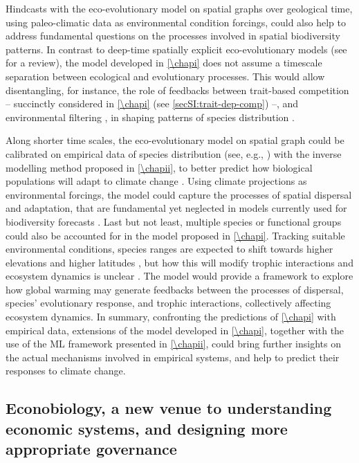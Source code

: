 Hindcasts with the eco-evolutionary model on spatial graphs over geological time, using paleo-climatic data \citep{STRAUME2020126} as environmental condition forcings, could also help to address fundamental questions on the processes involved in spatial biodiversity patterns. In contrast to deep-time spatially explicit eco-evolutionary models (see \cite{Hagen2022} for a review), the model developed in \cref{\chapi} does not assume a timescale separation between ecological and evolutionary processes.
% 
This would allow disentangling, for instance, the role of feedbacks between trait-based competition \citep{Dieckmann1999} -- succinctly considered in \cref{\chapi} (see \cref{secSI:trait-dep-comp}) --, and environmental filtering \citep{Doebeli2003}, in shaping patterns of species distribution \citep{Rahbek2019a}.

Along shorter time scales, the eco-evolutionary model on spatial graph could be calibrated on empirical data of species distribution (see, e.g., \cite{Abegg2020,GBIF:TheGlobalBiodiversityInformationFacility2022}) with the inverse modelling method proposed in \cref{\chapii}, to better predict how biological populations will adapt to climate change \citep{Norberg2012,Urban2016}. Using climate projections \citep{Kriticos2012} as environmental forcings, the model could capture the processes of spatial dispersal and adaptation, that are fundamental yet neglected in models currently used for biodiversity forecasts \citep{Pearson2003}.
% 
Last but not least, multiple species or functional groups could also be accounted for in the model proposed in \cref{\chapi}. Tracking suitable environmental conditions, species ranges are expected to shift towards higher elevations and higher latitudes \citep{Chen2011}, but how this will modify trophic interactions and ecosystem dynamics is unclear \citep{Descombes2020}.
% 
The model would provide a framework to explore how global warming may generate feedbacks between the processes of dispersal, species' evolutionary response, and trophic interactions, collectively affecting ecosystem dynamics.
% 
In summary, confronting the predictions of \cref{\chapi} with empirical data, extensions of the model developed in \cref{\chapi}, together with the use of the ML framework presented in \cref{\chapii}, could bring further insights on the actual mechanisms involved in empirical systems, and help to predict their responses to climate change. 


\subsection{Econobiology, a new venue to understanding economic systems, and designing more appropriate governance}


